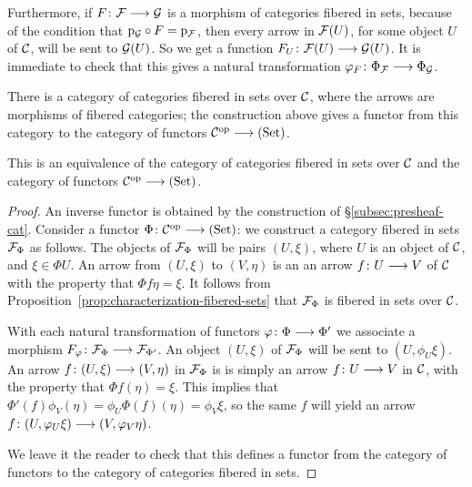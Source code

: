 \begin{3   FIBERED CATEGORIES}
\begin{3.4 Functors and cats fibered in sets}
Furthermore, if $F \colon \cF \arr \cG$ is a morphism of categories fibered in sets, because of the condition that $\mathrm{p}_{\mathcal{G}} \circ F = \mathrm{p}_{\mathcal{F}}$, then every arrow in $\mathcal{F}(U)$, for some object $U$ of $\mathcal{C}$, will be sent to $\mathcal{G}(U)$. So we get a function $F_U \colon \cF(U) \arr \cG(U)$. It is immediate to check that this gives a natural transformation $\phi_F \colon \Phi_\cF \arr \Phi_\cG$.

There is a category of categories fibered in sets over $\mathcal{C}$, where the arrows are morphisms of fibered categories; the construction above gives a functor from this category to the category of functors $\cC\op \arr \catset$.

\begin{proposition}

This is an equivalence of the category of categories fibered in sets over $\mathcal{C}$ and the category of functors $\cC\op \arr \catset$.
\end{proposition}

\begin{proof} An inverse functor is obtained by the construction of \S\ref{subsec:presheaf-cat}. Consider a functor $\Phi \colon \cC\op \arr \catset $: we construct a category fibered in sets $\mathcal{F}_\Phi$ as follows. The objects of $\mathcal{F}_\Phi$ will be pairs $(U, \xi)$, where $U$ is an object of $\mathcal{C}$, and $\xi\in \Phi U$. An arrow from $(U, \xi)$ to $(V, \eta)$ is an an arrow $f \colon U \arr V$ of $\mathcal{C}$ with the property that $\Phi f \eta = \xi$. It follows from Proposition~\ref{prop:characterization-fibered-sets} that $\mathcal{F}_\Phi$ is fibered in sets over $\mathcal{C}$.

With each natural transformation of functors $\phi\colon \Phi \arr \Phi'$ we associate a morphism $F_\phi \colon \cF_\Phi \arr \cF_{\Phi'}$. An object $(U, \xi)$ of $\mathcal{F}_\Phi$ will be sent to $(U, \phi_U \xi)$. An arrow $f \colon (U, \xi) \arr (V, \eta)$ in $\mathcal{F}_\Phi$ is is simply an arrow $f \colon U \arr V$ in $\mathcal{C}$, with the property that $\Phi f(\eta) = \xi $. This implies that $\Phi'(f) \phi_V(\eta) = \phi_U \Phi(f) (\eta) = \phi_V \xi$, so the same $f$ will yield an arrow $f \colon (U, \phi_U \xi) \arr (V, \phi_V \eta)$. 

We leave it the reader to check that this defines a functor from the category of functors to the category of categories fibered in sets.
\end{proof}


\end{3.4 Functors and cats fibered in sets}
\end{3   FIBERED CATEGORIES}
